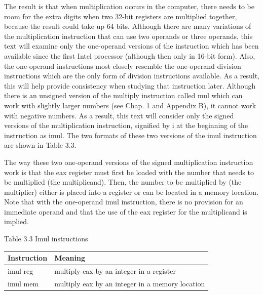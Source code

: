 \documentclass[10pt]{book}
\begin{document}
The result is that when multiplication occurs in the computer, there needs to be room for the extra digits when two 32-bit registers are multiplied together, because the result could take up 64 bits. Although there are many variations of the multiplication instruction that can use two operands or three operands, this text will examine only the one-operand versions of the instruction which has been available since the first Intel processor (although then only in 16-bit form). Also, the one-operand instructions most closely resemble the one-operand division instructions which are the only form of division instructions available. As a result, this will help provide consistency when studying that instruction later. Although there is an unsigned version of the multiply instruction called mul which can work with slightly larger numbers (see Chap. 1 and Appendix B), it cannot work with negative numbers. As a result, this text will consider only the signed versions of the multiplication instruction, signified by i at the beginning of the instruction as imul. The two formats of these two versions of the imul instruction are shown in Table 3.3.

The way these two one-operand versions of the signed multiplication instruction work is that the eax register must first be loaded with the number that needs to be multiplied (the multiplicand). Then, the number to be multiplied by (the multiplier) either is placed into a register or can be located in a memory location. Note that with the one-operand imul instruction, there is no provision for an immediate operand and that the use of the eax register for the multiplicand is implied.

Table 3.3 Imul instructions

\begin{center}
\begin{tabular}{|l|l|}
\hline
Instruction & Meaning \\
\hline
imul reg & multiply eax by an integer in a register \\
\hline
imul mem & multiply eax by an integer in a memory location \\
\hline
\end{tabular}
\end{center}
\end{document}

